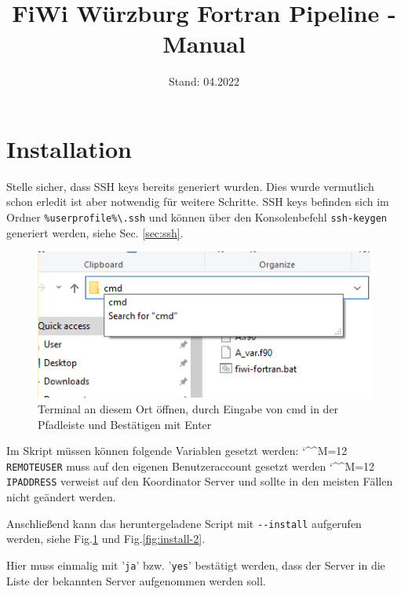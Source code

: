 \documentclass[11pt, a4paper]{article}
\title{\vspace{+3cm}FiWi Würzburg Fortran Pipeline - Manual}
\date{Stand: 04.2022}
\newcommand{\bs}{\textbackslash}
\def\e{\begingroup\catcode`\^^M=12 \xmymacro}
{\catcode`\^^M=12 %
 \gdef\xmymacro#1^^M{\begin{itemize}\item #1\end{itemize}\endgroup}%
}
\begin{document}
\maketitle

\bigskip\noindent

\newpage

\tableofcontents
\label{summary}

\newpage


\vspace{-1cm}
\section{Installation}


Stelle sicher, dass SSH keys bereits generiert wurden. Dies wurde vermutlich schon erledit ist aber notwendig für weitere Schritte.
SSH keys befinden sich im Ordner \texttt{\%userprofile\%\bs.ssh} und können über den Konsolenbefehl \texttt{ssh-keygen} generiert werden, siehe Sec. \ref{sec:ssh}.

\begin{figure}
    \centering
    \includegraphics[width=0.85\linewidth]{./pics/2022-03-16_15-36.png}
    \caption{Terminal an diesem Ort öffnen, durch Eingabe von cmd in der Pfadleiste und Bestätigen mit Enter}
    \vspace{-4em}
    \label{fig:install-1}
\end{figure}

Im Skript müssen können folgende Variablen gesetzt werden:
\e \texttt{REMOTEUSER} muss auf den eigenen Benutzeraccount gesetzt werden
\e \texttt{IPADDRESS} verweist auf den Koordinator Server und sollte in den meisten Fällen nicht geändert werden.

Anschließend kann das heruntergeladene Script mit \texttt{-{}-install} aufgerufen werden, siehe Fig.\ref{fig:install-1} und Fig.\ref{fig:install-2}.

Hier muss einmalig mit '\texttt{ja}' bzw. '\texttt{yes}' bestätigt werden, dass der Server in die Liste der bekannten Server aufgenommen werden soll.
\end{document}
